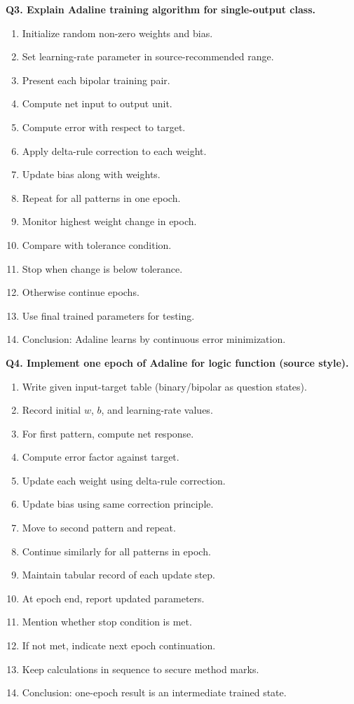 \documentclass[11pt,a4paper]{article}
\begin{document}
\textbf{Q3. Explain Adaline training algorithm for single-output class.}
\begin{enumerate}
\item Initialize random non-zero weights and bias.
\item Set learning-rate parameter in source-recommended range.
\item Present each bipolar training pair.
\item Compute net input to output unit.
\item Compute error with respect to target.
\item Apply delta-rule correction to each weight.
\item Update bias along with weights.
\item Repeat for all patterns in one epoch.
\item Monitor highest weight change in epoch.
\item Compare with tolerance condition.
\item Stop when change is below tolerance.
\item Otherwise continue epochs.
\item Use final trained parameters for testing.
\item Conclusion: Adaline learns by continuous error minimization.
\end{enumerate}

\textbf{Q4. Implement one epoch of Adaline for logic function (source style).}
\begin{enumerate}
\item Write given input-target table (binary/bipolar as question states).
\item Record initial $w$, $b$, and learning-rate values.
\item For first pattern, compute net response.
\item Compute error factor against target.
\item Update each weight using delta-rule correction.
\item Update bias using same correction principle.
\item Move to second pattern and repeat.
\item Continue similarly for all patterns in epoch.
\item Maintain tabular record of each update step.
\item At epoch end, report updated parameters.
\item Mention whether stop condition is met.
\item If not met, indicate next epoch continuation.
\item Keep calculations in sequence to secure method marks.
\item Conclusion: one-epoch result is an intermediate trained state.
\end{enumerate}
\end{document}
